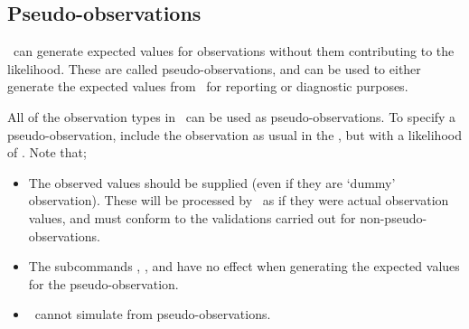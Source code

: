 \subsection{Pseudo-observations}

\SPM\ can generate expected values for observations without them contributing to the likelihood. These are called pseudo-observations, and can be used to either generate the expected values from \SPM\ for reporting or diagnostic purposes.

All of the observation types in \SPM\ can be used as pseudo-observations. To specify a pseudo-observation, include the observation as usual in the \config, but with a likelihood of . Note that;

\begin{itemize}
  \item The observed values should be supplied (even if they are `dummy' observation). These will be processed by \SPM\ as if they were actual observation values, and must conform to the validations carried out for non-pseudo-observations. 
  \item The subcommands , ,  and  have no effect when generating the expected values for the pseudo-observation.   \item \SPM\ cannot simulate from pseudo-observations.
\end{itemize}
